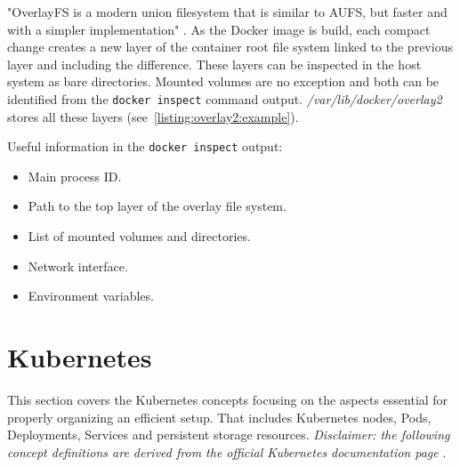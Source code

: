 

"OverlayFS is a modern union filesystem that is similar to AUFS, but faster and with a simpler implementation" \cite{docs:docker:overlayfs}. As the Docker image is build, each compact change creates a new layer of the container root file system linked to the previous layer and including the difference. These layers can be inspected in the host system as bare directories. Mounted volumes are no exception and both can be identified from the \texttt{docker inspect} command output. \textit{/var/lib/docker/overlay2} stores all these layers (see~\autoref{listing:overlay2:example}). 



Useful information in the \texttt{docker inspect} output:
\begin{itemize}[noitemsep]
	\item Main process ID.
	\item Path to the top layer of the overlay file system.
	\item List of mounted volumes and directories.
	\item Network interface.
	\item Environment variables.
\end{itemize}

\section{Kubernetes \label{anal:k8s}}
This section covers the Kubernetes concepts focusing on the aspects essential for properly organizing an efficient setup. That includes Kubernetes nodes, Pods, Deployments, Services and persistent storage resources. \textit{Disclaimer: the following concept definitions are derived from the official Kubernetes documentation page} \cite{docs:k8s:concepts}.

